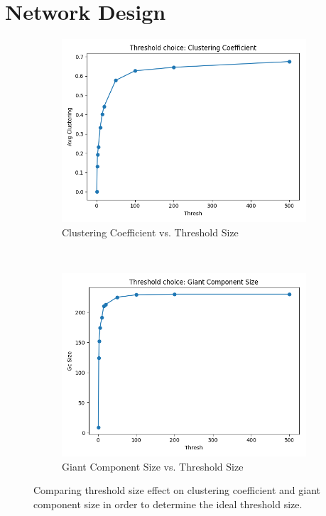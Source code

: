 \documentclass[12pt]{article}
\begin{document}
\section*{Network Design}

\begin{figure}[t]
    \centering
    \begin{subfigure}{0.4\textwidth}
        \includegraphics[width=1.\textwidth]{./data/plots/thresh_vs_avg_clustering.png}
        \caption{Clustering Coefficient vs. Threshold Size}
    \end{subfigure}
    ~
    \begin{subfigure}{0.4\textwidth}
        \includegraphics[width=1.\textwidth]{./data/plots/thresh_vs_gc_size.png}
        \caption{Giant Component Size vs. Threshold Size}
    \end{subfigure}
    \caption{Comparing threshold size effect on clustering coefficient and giant component size in order to determine the ideal threshold size.}
    \label{fig-threshold-size}
\end{figure}
\end{document}
